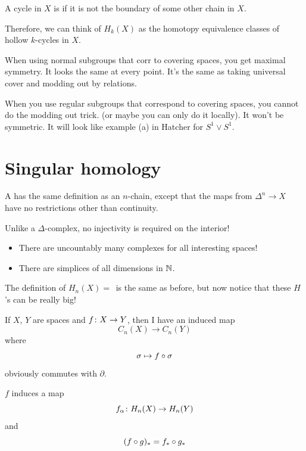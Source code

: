 \documentclass[11pt,leqno,oneside]{amsart}
\newenvironment{dateenv}{
  \vspace{1em}
}{
  \vspace{1em}
}
\newcommand{\mydate}[4]{
  \newdate{#1}{#2}{#3}{#4}
  \begin{dateenv}
    \hfill\displaydate{#1}
  \end{dateenv}
}
\numberwithin{thm}{section}
\renewcommand{\d}{\partial}
\begin{document}
\begin{thm}
  A cycle in $X$ is  if it is not the boundary of some other chain in $X$.
\end{thm}
\begin{rmk}
  Therefore, we can think of $H_k(X)$ as the homotopy equivalence classes of hollow $k$-cycles in $X$.
\end{rmk}




\mydate{d15}{1}{3}{2017}

\mydate{d16}{3}{3}{2017}

When using normal subgroups that corr to covering spaces, you get
maximal symmetry. It looks the same at every point. It's the same as
taking universal cover and modding out by relations.

When you use regular subgroups that correspond to covering spaces, you cannot
do the modding out trick.  (or maybe you can only do it locally).  It
won't be symmetric.  It will look like example (a) in Hatcher for $S^1 \vee
S^1$.


\section*{Singular homology}

\begin{defn}
  A  has the same definition as an $n$-chain, except that the maps from $\Delta^n \to X$ have no restrictions other than continuity.
\end{defn}
\begin{rmk}
  Unlike a $\Delta$-complex, no injectivity is required on the interior!
  \begin{itemize}
    \item There are uncountably many complexes for all interesting spaces!
    \item There are simplices of all dimensions in ${\mathbb N}$.
  \end{itemize}
\end{rmk}


The definition of  $H_n(X) = \frac{}{}$ is the same as before, but now notice that these $H$'s can be really big!

If $X$, $Y$ are spaces and $f \colon X \to Y$, then I have an induced map $$C_n(X) \to C_n(Y)$$ where $$ \sigma \mapsto f \circ \sigma$$ obviously commutes with $\d$.

\begin{thm}
  $f$ induces a map $$f_\alpha \colon H_n(X) \to H_n(Y)$$ and $$(f \circ g)_\ast = f_\ast \circ g_\ast$$
\end{thm}
\end{document}
